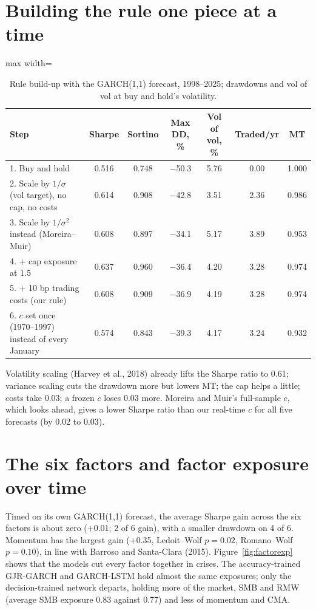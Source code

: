 \section{Building the rule one piece at a time}\label{app:buildup}

\begin{table}[htbp]
\centering\small
\caption{Rule build-up with the GARCH(1,1) forecast, 1998--2025; drawdowns and vol of vol at buy and hold's volatility.}\label{tab:buildup}
\begin{adjustbox}{max width=\linewidth}\begin{tabular}{@{}lcccccc@{}}
\toprule
Step & Sharpe & Sortino & Max DD, \% & Vol of vol, \% & Traded/yr & MT\\
\midrule
1. Buy and hold & 0.516 & 0.748 & $-$50.3 & 5.76 & 0.00 & 1.000\\
2. Scale by $1/\sigma$ (vol target), no cap, no costs & 0.614 & 0.908 & $-$42.8 & 3.51 & 2.36 & 0.986\\
3. Scale by $1/\sigma^2$ instead (Moreira--Muir) & 0.608 & 0.897 & $-$34.1 & 5.17 & 3.89 & 0.953\\
4. + cap exposure at 1.5 & 0.637 & 0.960 & $-$36.4 & 4.20 & 3.28 & 0.974\\
5. + 10 bp trading costs (our rule) & 0.608 & 0.909 & $-$36.9 & 4.19 & 3.28 & 0.974\\
6. $c$ set once (1970--1997) instead of every January & 0.574 & 0.843 & $-$39.3 & 4.17 & 3.24 & 0.932\\
\bottomrule
\end{tabular}\end{adjustbox}
\end{table}

Volatility scaling (Harvey et al., 2018) already lifts the Sharpe ratio to 0.61; variance scaling cuts the drawdown more but lowers MT; the cap helps a little; costs take 0.03; a frozen $c$ loses 0.03 more. Moreira and Muir's full-sample $c$, which looks ahead, gives a lower Sharpe ratio than our real-time $c$ for all five forecasts (by 0.02 to 0.03).

\section{The six factors and factor exposure over time}\label{app:factors}
Timed on its own GARCH(1,1) forecast, the average Sharpe gain across the six factors is about zero ($+$0.01; 2 of 6 gain), with a smaller drawdown on 4 of 6. Momentum has the largest gain ($+$0.35, Ledoit--Wolf $p=0.02$, Romano--Wolf $p=0.10$), in line with Barroso and Santa-Clara (2015). Figure~\ref{fig:factorexp} shows that the models cut every factor together in crises. The accuracy-trained GJR-GARCH and GARCH-LSTM hold almost the same exposures; only the decision-trained network departs, holding more of the market, SMB and RMW (average SMB exposure 0.83 against 0.77) and less of momentum and CMA.


